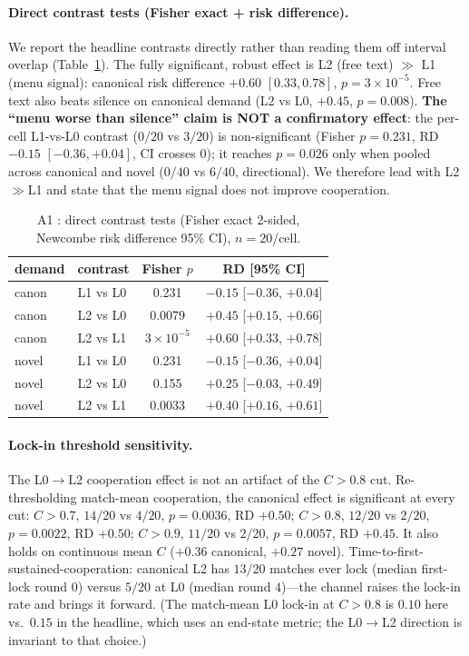 \paragraph{Direct contrast tests (Fisher exact + risk difference).}
We report the headline contrasts directly rather than reading them off interval overlap
(Table~\ref{tab:app-a1-contrast}). The fully significant, robust effect is L2 (free text)
$\gg$ L1 (menu signal): canonical risk difference $+0.60$ $[0.33,0.78]$,
$p{=}3{\times}10^{-5}$. Free text also beats silence on canonical demand (L2 vs L0, $+0.45$,
$p{=}0.008$). \textbf{The ``menu worse than silence'' claim is NOT a confirmatory effect}: the
per-cell L1-vs-L0 contrast ($0/20$ vs $3/20$) is non-significant (Fisher $p{=}0.231$, RD
$-0.15$ $[-0.36,+0.04]$, CI crosses $0$); it reaches $p{=}0.026$ only when pooled across
canonical and novel ($0/40$ vs $6/40$, directional). We therefore lead with L2$\gg$L1 and state
that the menu signal does not improve cooperation.

\begin{table}[h]
\centering
\caption{A1 \tC{}: direct contrast tests (Fisher exact 2-sided, Newcombe risk difference 95\%
CI), $n{=}20$/cell.}
\label{tab:app-a1-contrast}
\small
\begin{tabular}{llcc}
\toprule
demand & contrast & Fisher $p$ & RD [95\% CI] \\
\midrule
canon & L1 vs L0 & 0.231 & $-0.15$ [$-0.36$, $+0.04$] \\
canon & L2 vs L0 & 0.0079 & $+0.45$ [$+0.15$, $+0.66$] \\
canon & L2 vs L1 & $3\!\times\!10^{-5}$ & $+0.60$ [$+0.33$, $+0.78$] \\
novel & L1 vs L0 & 0.231 & $-0.15$ [$-0.36$, $+0.04$] \\
novel & L2 vs L0 & 0.155 & $+0.25$ [$-0.03$, $+0.49$] \\
novel & L2 vs L1 & 0.0033 & $+0.40$ [$+0.16$, $+0.61$] \\
\bottomrule
\end{tabular}
\end{table}

\paragraph{Lock-in threshold sensitivity.}
The L0$\to$L2 cooperation effect is not an artifact of the $C>0.8$ cut. Re-thresholding
match-mean cooperation, the canonical effect is significant at every cut: $C>0.7$, $14/20$ vs
$4/20$, $p{=}0.0036$, RD $+0.50$; $C>0.8$, $12/20$ vs $2/20$, $p{=}0.0022$, RD $+0.50$; $C>0.9$,
$11/20$ vs $2/20$, $p{=}0.0057$, RD $+0.45$. It also holds on continuous mean $C$ ($+0.36$
canonical, $+0.27$ novel). Time-to-first-sustained-cooperation: canonical L2 has $13/20$ matches
ever lock (median first-lock round $0$) versus $5/20$ at L0 (median round $4$)---the channel
raises the lock-in rate and brings it forward. (The match-mean L0 lock-in at $C>0.8$ is $0.10$
here vs.\ $0.15$ in the headline, which uses an end-state metric; the L0$\to$L2 direction is
invariant to that choice.)

